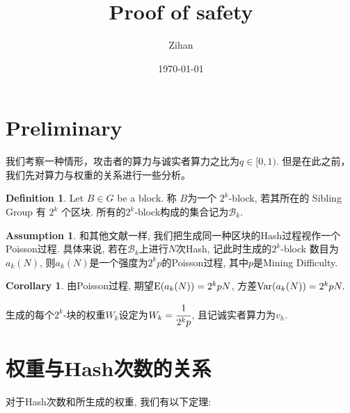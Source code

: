 \documentclass[UTF8]{ctexart}
\title{Proof of safety}
\author{Zihan}
\date{\today}
\theoremstyle{definition}
\newtheorem{definition}{Definition}
\newtheorem*{assumption}{Assumption}
\newtheorem*{corollary}{Corollary}
\theoremstyle{plain}
\begin{document}
\maketitle

\section{Preliminary}
我们考察一种情形，攻击者的算力与诚实者算力之比为$q \in [0,1)$. 但是在此之前，我们先对算力与权重的关系进行一些分析。

\begin{definition}
    Let $B\in G$ be a block. 称 $B$为一个 $2^k$-block, 若其所在的 Sibling Group 有 $2^k$ 个区块. 
所有的$2^k$-block构成的集合记为$\mathcal{B}_k$.
\end{definition}




\begin{assumption}
    和其他文献一样, 我们把生成同一种区块的Hash过程视作一个Poisson过程. 具体来说, 若在$\mathcal{B}_k$上进行$N$次Hash, 记此时生成的$2^k$-block
    数目为$a_k(N)$, 则$a_k(N)$是一个强度为$2^kp$的Poisson过程, 其中$p$是Mining Difficulty.
\end{assumption}
\begin{corollary}
    由Poisson过程, 期望${\rm E}(a_k(N)) = 2^k p N$, 方差${\rm Var}(a_k(N))= 2^k p N.$
\end{corollary}
生成的每个$2^k$-块的权重$W_k$设定为$W_k = \cfrac{1}{2^k p}$, 且记诚实者算力为$v_h$.


\section{权重与Hash次数的关系}
对于Hash次数和所生成的权重, 我们有以下定理:
\end{document}
